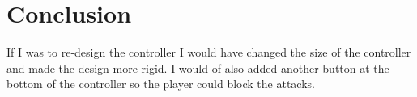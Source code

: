 \documentclass{scrartcl}
\begin{document}
\section{Conclusion}

If I was to re-design the controller I would have changed the size of the controller and made the design more rigid. I would of also added another button at the bottom of the controller so the player could block the attacks.



\end{document}
